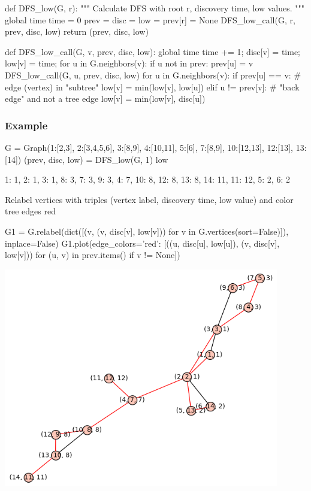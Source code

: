 \medskip
\begin{sageCell}
def DFS_low(G, r):
    """
    Calculate DFS with root r, discovery time, low values.
    """
    global time
    time = 0
    prev = {}
    disc = {}
    low = {}
    prev[r] = None
    DFS_low_call(G, r, prev, disc, low)
    return (prev, disc, low)

def DFS_low_call(G, v, prev, disc, low):
    global time
    time += 1;
    disc[v] = time;
    low[v] = time;
    for u in G.neighbors(v):
        if u not in prev:
            prev[u] = v
            DFS_low_call(G, u, prev, disc, low)
    for u in G.neighbors(v):
        if prev[u] == v:
            # edge (vertex) in "subtree"
            low[v] = min(low[v], low[u])
        elif u != prev[v]:
            # "back edge" and not a tree edge
            low[v] = min(low[v], disc[u])
\end{sageCell}

\subsubsection*{Example}

\begin{sageCell}
    G = Graph({1:[2,3], 2:[3,4,5,6], 3:[8,9], 4:[10,11], 5:[6], 7:[8,9],
    10:[12,13], 12:[13], 13:[14]})
    (prev, disc, low) = DFS_low(G, 1)
    low
\end{sageCell}
\begin{outCell}
    {1: 1,
     2: 1,
     3: 1,
     8: 3,
     7: 3,
     9: 3,
     4: 7,
     10: 8,
     12: 8,
     13: 8,
     14: 11,
     11: 12,
     5: 2,
     6: 2}
\end{outCell}

Relabel vertices with triples (vertex label, discovery time, low value) and color tree edges red

\begin{sageCell}
    G1 = G.relabel(dict([(v, (v, disc[v], low[v])) for
        v in G.vertices(sort=False)]), inplace=False)
    G1.plot(edge_colors={'red': [((u, disc[u], low[u]), (v, disc[v],
        low[v])) for (u, v) in prev.items() if v != None]})
\end{sageCell}
\begin{outImage}
    \includegraphics[width=0.9\textwidth]{Images/Low/output_low.png}
\end{outImage}

